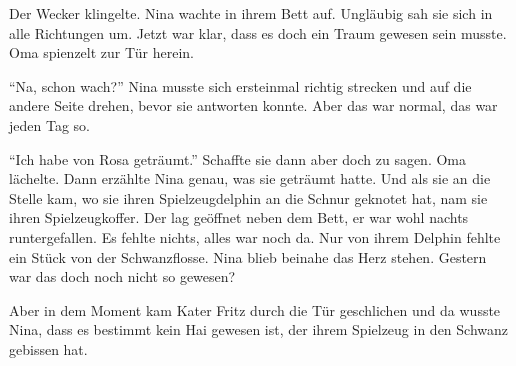 \medskip
\begin{mdframed}[style=mystyle]
Der Wecker klingelte. Nina wachte in ihrem Bett auf. Ungläubig sah sie sich in alle Richtungen um. Jetzt war klar, dass es doch ein Traum gewesen sein musste. Oma spienzelt zur Tür herein.

\enquote{Na, schon wach?} Nina musste sich ersteinmal richtig strecken und auf die andere Seite drehen, bevor sie antworten konnte. Aber das war normal, das war jeden Tag so.

\enquote{Ich habe von Rosa geträumt.} Schaffte sie dann aber doch zu sagen. Oma lächelte. Dann erzählte Nina genau, was sie geträumt hatte. Und als sie an die Stelle kam, wo sie ihren Spielzeugdelphin an die Schnur geknotet hat, nam sie ihren Spielzeugkoffer. Der lag geöffnet neben dem Bett, er war wohl nachts runtergefallen. Es fehlte nichts, alles war noch da. Nur von ihrem Delphin fehlte ein Stück von der Schwanzflosse. Nina blieb beinahe das Herz stehen. Gestern war das doch noch nicht so gewesen?

Aber in dem Moment kam Kater Fritz durch die Tür geschlichen und da wusste Nina, dass es bestimmt kein Hai gewesen ist, der ihrem Spielzeug in den Schwanz gebissen hat. 
\end{mdframed}\medskip
